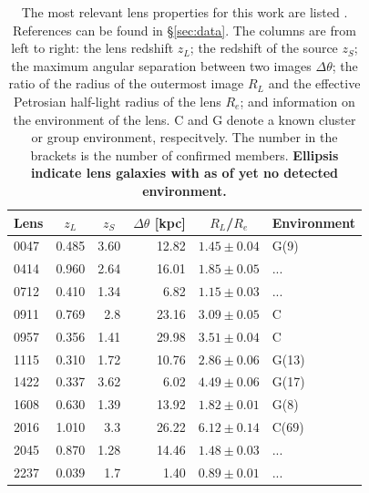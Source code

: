 \documentclass[useAMS,usenatbib]{mn2e}
\newcommand{\cb}[1]{{\color{red} \textbf{#1}}}
\begin{document}
\begin{table}
  \begin{center}
    \begin{tabular}{l r r r r l}
      Lens    & \multicolumn{1}{c}{$z_{L}$} & \multicolumn{1}{c}{$z_{S}$} & \multicolumn{1}{c}{$\Delta\theta$ [kpc]} & \multicolumn{1}{c}{$R_{L}$/$R_{e}$} & Environment \\ \hline
      0047 & 0.485 & 3.60 & 12.82 & $1.45\pm0.04$ & G(9) \\
      0414 & 0.960 & 2.64 & 16.01 & $1.85\pm0.05$ & ... \\
      0712 & 0.410 & 1.34 & 6.82  & $1.15\pm0.03$ & ... \\
      0911 & 0.769 & 2.8  & 23.16 & $3.09\pm0.05$ & C \\
      0957 & 0.356 & 1.41 & 29.98 & $3.51\pm0.04$ & C \\
      1115 & 0.310 & 1.72 & 10.76 & $2.86\pm0.06$ & G(13) \\
      1422 & 0.337 & 3.62 & 6.02  & $4.49\pm0.06$ & G(17) \\
      1608 & 0.630 & 1.39 & 13.92 & $1.82\pm0.01$ & G(8) \\
      2016 & 1.010 & 3.3  & 26.22 & $6.12\pm0.14$ & C(69) \\
      2045 & 0.870 & 1.28 & 14.46 & $1.48\pm0.03$ & ... \\
      2237 & 0.039 & 1.7  & 1.40  & $0.89\pm0.01$ & ... \\
    \end{tabular}
    \caption[width=\linewidth]{The most relevant lens properties for this work are listed \citep[for an expanded version of this table see][]{2011ApJ...740...97L}. References can be found in \S\ref{sec:data}. The columns are from left to right: the lens redshift $z_L$; the redshift of the source $z_S$; the maximum angular separation between two images $\Delta\theta$; the ratio of the radius of the outermost image $R_L$ and the effective Petrosian half-light radius of the lens $R_e$; and information on the environment of the lens. C and G denote a known cluster or group environment, respecitvely. The number in the brackets is the number of confirmed members. \cb{Ellipsis indicate lens galaxies with as of yet no detected environment.}}
    \label{tab:lensproperties}
  \end{center}
\end{table}
\end{document}
